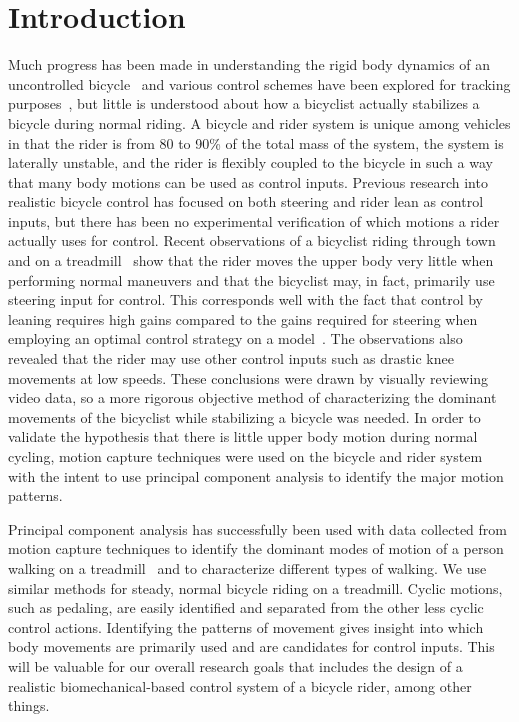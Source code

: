 \documentclass[smallextended]{svjour3}     %
\begin{document}
\section{Introduction}
\label{intro}
Much progress has been made in understanding the rigid body dynamics of an
uncontrolled bicycle~\cite{Meijaard2007,Kooijman2008} and various control schemes have been
explored for tracking purposes~\cite{Peterson2008a,Schwab2008,Sharp2008a}, but
little is understood about how a bicyclist actually stabilizes a bicycle during
normal riding. A bicycle and rider system is unique among vehicles in
that the rider is from 80 to 90\% of the total mass of the system, the
system is laterally unstable, and the rider is flexibly coupled to the
bicycle in such a way that many body motions can be used as control inputs.
Previous research into realistic bicycle control has focused on both steering
and rider lean as control inputs, but there has been no experimental
verification of which motions a rider actually uses for control. Recent
observations of a bicyclist riding through town and on a
treadmill~\cite{Kooijman2009a} show that the rider moves the upper body very
little when performing normal maneuvers and that the bicyclist may, in fact,
primarily use steering input for control. This corresponds well with the fact
that control by leaning requires high gains compared to the gains required for
steering when employing an optimal control strategy on a
model~\cite{Peterson2008a,Schwab2008,Sharp2008a}. The observations also
revealed
that the rider may use other control inputs such as drastic knee movements at
low speeds. These conclusions were drawn by visually reviewing video data, so a
more rigorous objective method of characterizing the dominant movements of the
bicyclist while stabilizing a bicycle was needed. In order to validate the
hypothesis that there is little upper body motion during normal cycling, motion
capture techniques were used on the bicycle and rider system with the intent to
use principal component analysis to identify the major motion patterns.

Principal component analysis has successfully been used with data collected
from motion capture techniques to identify the dominant modes of motion of a
person walking on a treadmill~\cite{Troje2002} and to characterize different
types of walking. We use similar methods for steady, normal bicycle riding on a
treadmill. Cyclic motions, such as pedaling, are easily identified and
separated from the other less cyclic control actions. Identifying the patterns
of movement gives insight into which body movements are primarily used and are
candidates for control inputs. This will be valuable for our overall research
goals that includes the design of a realistic
biomechanical-based control system of a bicycle rider, among other things.
\end{document}
